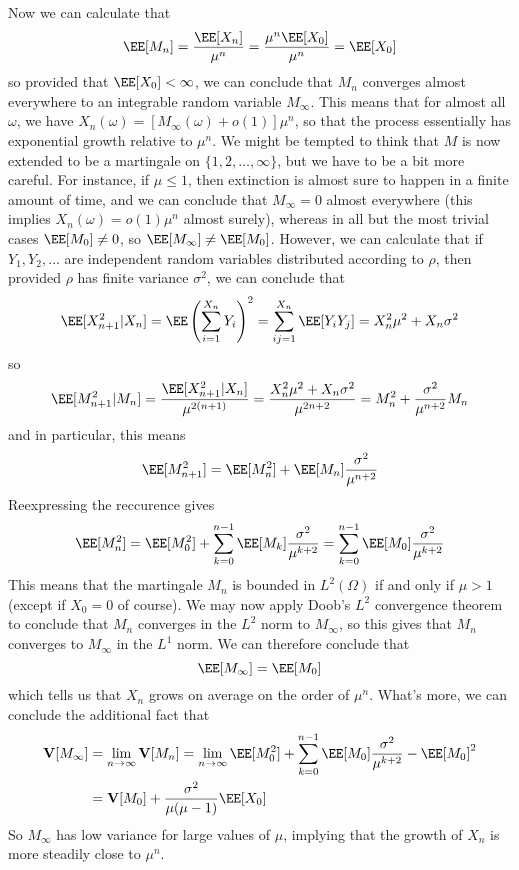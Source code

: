 Now we can calculate that
%
\[ \EE[M_n] = \frac{\EE[X_n]}{\mu^n} = \frac{\mu^n \EE[X_0]}{\mu^n} = \EE[X_0] \]
%
so provided that $\EE[X_0] < \infty$, we can conclude that $M_n$ converges almost everywhere to an integrable random variable $M_\infty$. This means that for almost all $\omega$, we have $X_n(\omega) = [M_\infty(\omega) + o(1)] \mu^n$, so that the process essentially has exponential growth relative to $\mu^n$. We might be tempted to think that $M$ is now extended to be a martingale on $\{ 1, 2, \dots, \infty \}$, but we have to be a bit more careful. For instance, if $\mu \leq 1$, then extinction is almost sure to happen in a finite amount of time, and we can conclude that $M_\infty = 0$ almost everywhere (this implies $X_n(\omega) = o(1) \mu^n$ almost surely), whereas in all but the most trivial cases $\EE[M_0] \neq 0$, so $\EE[M_\infty] \neq \EE[M_0]$. However, we can calculate that if $Y_1, Y_2, \dots$ are independent random variables distributed according to $\rho$, then provided $\rho$ has finite variance $\sigma^2$, we can conclude that
%
\[ \EE[X_{n+1}^2|X_n] = \EE \left( \sum_{i = 1}^{X_n} Y_i \right)^2 = \sum_{ij = 1}^{X_n} \EE[Y_iY_j] = X_n^2 \mu^2 + X_n \sigma^2 \]
%
so
%
\[ \EE[M_{n+1}^2|M_n] = \frac{\EE[X_{n+1}^2|X_n]}{\mu^{2(n+1)}} = \frac{X_n^2 \mu^2 + X_n \sigma^2}{\mu^{2n+2}} = M_n^2 + \frac{\sigma^2}{\mu^{n + 2}} M_n \]
%
and in particular, this means
%
\[ \EE[M_{n+1}^2] = \EE[M_n^2] + \EE[M_n] \frac{\sigma^2}{\mu^{n + 2}} \]
%
Reexpressing the reccurence gives
%
\[ \EE[M_n^2] = \EE[M_0^2] + \sum_{k = 0}^{n-1} \EE[M_k] \frac{\sigma^2}{\mu^{k+2}} = \sum_{k = 0}^{n-1} \EE[M_0] \frac{\sigma^2}{\mu^{k+2}} \]
%
This means that the martingale $M_n$ is bounded in $L^2(\Omega)$ if and only if $\mu > 1$ (except if $X_0 = 0$ of course). We may now apply Doob's $L^2$ convergence theorem to conclude that $M_n$ converges in the $L^2$ norm to $M_\infty$, so this gives that $M_n$ converges to $M_\infty$ in the $L^1$ norm. We can therefore conclude that
%
\[ \EE[M_\infty] = \EE[M_0] \]
%
which tells us that $X_n$ grows on average on the order of $\mu^n$. What's more, we can conclude the additional fact that
%
\begin{align*}
    \mathbf{V}[M_\infty] &= \lim_{n \to \infty} \mathbf{V}[M_n] = \lim_{n \to \infty} \EE[M_0^2] + \sum_{k = 0}^{n-1} \EE[M_0] \frac{\sigma^2}{\mu^{k+2}} - \EE[M_0]^2\\
    &= \mathbf{V}[M_0] + \frac{\sigma^2}{\mu(\mu - 1)} \EE[X_0]
\end{align*}
%
So $M_\infty$ has low variance for large values of $\mu$, implying that the growth of $X_n$ is more steadily close to $\mu^n$.

